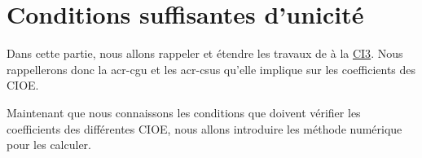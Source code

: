 \chapter{Conditions suffisantes d'unicité}
\label{sec:csu}
\minitoc
\newpage
{}
Dans cette partie, nous allons rappeler et étendre les travaux de \cite{stupfel_sufficient_2011} à la \hyperlink{ci3}{CI3}. Nous rappellerons donc la \gls{acr-cgu} et les \glspl{acr-csu} qu'elle implique sur les coefficients des CIOE.



Maintenant que nous connaissons les conditions que doivent vérifier les coefficients des différentes CIOE, nous allons introduire les méthode numérique pour les calculer.